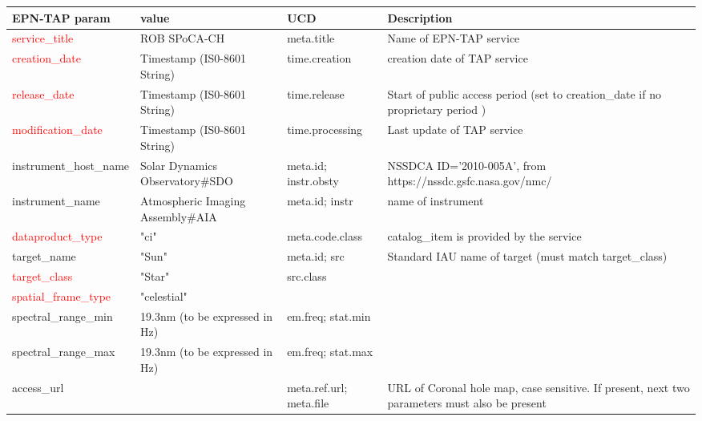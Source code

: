 \documentclass{article}
\begin{document}
\begin{longtable}{|p{4.5cm}|p{3.5cm}|p{2.5cm}|p{3.5cm}|}
\hline
EPN-TAP param                         & value                             & UCD                         & Description \\
\hline
\textcolor{red}{service\_title}       & ROB SPoCA-CH                      & meta.title                  & Name of EPN-TAP service \\
\hline
\textcolor{red}{creation\_date}       & Timestamp (IS0-8601 String)       & time.creation               & creation date of TAP service \\
\hline
\textcolor{red}{release\_date}        & Timestamp (IS0-8601 String)       & time.release                & Start of public access period (set to creation\_date if no proprietary period ) \\
\hline
\textcolor{red}{modification\_date}   & Timestamp (IS0-8601 String)       & time.processing             & Last update of TAP service \\
\hline
instrument\_host\_name                & Solar Dynamics Observatory\#SDO   & meta.id; instr.obsty        & NSSDCA ID='2010-005A', from https://nssdc.gsfc.nasa.gov/nmc/ \\
\hline
instrument\_name                      & Atmospheric Imaging Assembly\#AIA & meta.id; instr              & name of instrument \\
\hline
\textcolor{red}{dataproduct\_type}    & "ci"                              & meta.code.class             & catalog\_item is provided by the service \\
\hline
target\_name                          & "Sun"                             & meta.id; src                & Standard IAU name of target (must match target\_class) \\
\hline
\textcolor{red}{target\_class}        & "Star"                            & src.class                   & \\
\hline
\textcolor{red}{spatial\_frame\_type} & "celestial"                       &                             & \\
\hline
spectral\_range\_min                  & 19.3nm (to be expressed in Hz)    & em.freq; stat.min           & \\
\hline
spectral\_range\_max                  & 19.3nm (to be expressed in Hz)    & em.freq; stat.max           & \\
\hline
access\_url                           &                                   & meta.ref.url; meta.file     & URL of Coronal hole map, case sensitive. If present, next two parameters must also be present \\

\end{longtable}
\end{document}

